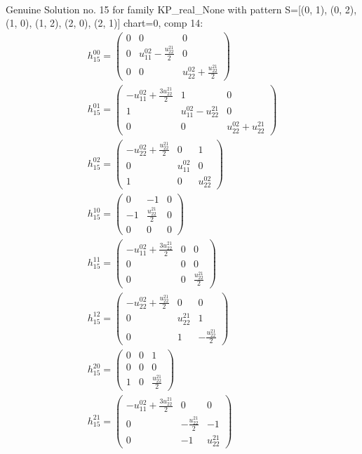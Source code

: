 \documentclass[a4paper, 11pt, twoside, onecolumn]{article}
\begin{document}
\begin{landscape}
\begin{gather*}
\end{gather*} 
Genuine Solution no. 15 for family KP_real_None with pattern S=[(0, 1), (0, 2), (1, 0), (1, 2), (2, 0), (2, 1)] chart=0, comp 14: 
\begin{gather*} 
	 h_{15}^{00}=\begin{pmatrix}0 & 0 & 0\\0 & u^{02}_{11} - \frac{u^{21}_{22}}{2} & 0\\0 & 0 & u^{02}_{22} + \frac{u^{21}_{22}}{2}\end{pmatrix}\\ 
	 h_{15}^{01}=\begin{pmatrix}- u^{02}_{11} + \frac{3 u^{21}_{22}}{2} & 1 & 0\\1 & u^{02}_{11} - u^{21}_{22} & 0\\0 & 0 & u^{02}_{22} + u^{21}_{22}\end{pmatrix}\\ 
	 h_{15}^{02}=\begin{pmatrix}- u^{02}_{22} + \frac{u^{21}_{22}}{2} & 0 & 1\\0 & u^{02}_{11} & 0\\1 & 0 & u^{02}_{22}\end{pmatrix}\\ 
	 h_{15}^{10}=\begin{pmatrix}0 & -1 & 0\\-1 & \frac{u^{21}_{22}}{2} & 0\\0 & 0 & 0\end{pmatrix}\\ 
	 h_{15}^{11}=\begin{pmatrix}- u^{02}_{11} + \frac{3 u^{21}_{22}}{2} & 0 & 0\\0 & 0 & 0\\0 & 0 & \frac{u^{21}_{22}}{2}\end{pmatrix}\\ 
	 h_{15}^{12}=\begin{pmatrix}- u^{02}_{22} + \frac{u^{21}_{22}}{2} & 0 & 0\\0 & u^{21}_{22} & 1\\0 & 1 & - \frac{u^{21}_{22}}{2}\end{pmatrix}\\ 
	 h_{15}^{20}=\begin{pmatrix}0 & 0 & 1\\0 & 0 & 0\\1 & 0 & \frac{u^{21}_{22}}{2}\end{pmatrix}\\ 
	 h_{15}^{21}=\begin{pmatrix}- u^{02}_{11} + \frac{3 u^{21}_{22}}{2} & 0 & 0\\0 & - \frac{u^{21}_{22}}{2} & -1\\0 & -1 & u^{21}_{22}\end{pmatrix}\\ 

\end{gather*}
\end{landscape}
\end{document}
